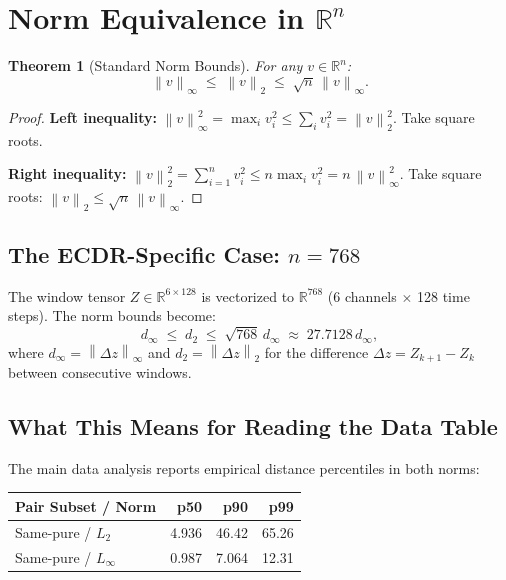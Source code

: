 \documentclass[11pt, a4paper]{article}
\theoremstyle{definition}
\theoremstyle{plain}
\newtheorem{theorem}{Theorem}[section]
\newcommand{\R}{\mathbb{R}}
\newcommand{\norm}[2]{\left\|#1\right\|_{#2}}
\begin{document}
\section{Norm Equivalence in $\R^n$}

\begin{theorem}[Standard Norm Bounds]
  For any $v \in \R^n$:
  \begin{equation}\label{eq:norm_bounds}
    \norm{v}{\infty}
    \;\le\; \norm{v}{2}
    \;\le\; \sqrt{n}\,\norm{v}{\infty}.
  \end{equation}
\end{theorem}

\begin{proof}
  \textbf{Left inequality:} $\norm{v}{\infty}^2 = \max_i v_i^2 \le \sum_i v_i^2 = \norm{v}{2}^2$.
  Take square roots.

  \textbf{Right inequality:} $\norm{v}{2}^2 = \sum_{i=1}^n v_i^2 \le n \max_i v_i^2 = n\,\norm{v}{\infty}^2$.
  Take square roots: $\norm{v}{2} \le \sqrt{n}\,\norm{v}{\infty}$.
\end{proof}

\subsection{The ECDR-Specific Case: $n = 768$}

The window tensor $Z \in \R^{6 \times 128}$ is vectorized to $\R^{768}$ (6 channels
$\times$ 128 time steps). The norm bounds become:
\begin{equation}
  d_\infty \;\le\; d_2 \;\le\; \sqrt{768}\,d_\infty \;\approx\; 27.7128\,d_\infty,
\end{equation}
where $d_\infty = \norm{\Delta z}{\infty}$ and $d_2 = \norm{\Delta z}{2}$ for
the difference $\Delta z = Z_{k+1} - Z_k$ between consecutive windows.

\subsection{What This Means for Reading the Data Table}

The main data analysis reports empirical distance percentiles in both norms:

\begin{center}
\small
\begin{tabular}{@{}lrrr@{}}
\toprule
Pair Subset / Norm & p50 & p90 & p99 \\
\midrule
Same-pure / $L_2$ & 4.936 & 46.42 & 65.26 \\
Same-pure / $L_\infty$ & 0.987 & 7.064 & 12.31 \\
\bottomrule
\end{tabular}
\end{center}
\end{document}
